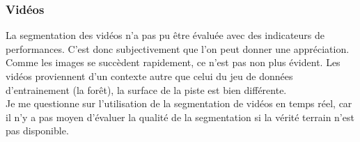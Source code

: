 \subsubsection{Vidéos}
\noindent La segmentation des vidéos n'a pas pu être évaluée avec des indicateurs de performances. C'est donc subjectivement que l'on peut donner une appréciation. Comme les images se succèdent rapidement, ce n'est pas non plus évident. Les vidéos proviennent d'un contexte autre que celui du jeu de données d'entrainement (la forêt), la surface de la piste est bien différente. 
\vspace{0.5\baselineskip}
\\
\noindent Je me questionne sur l'utilisation de la segmentation de vidéos en temps réel, car il n'y a pas moyen d'évaluer la qualité de la segmentation si la vérité terrain n'est pas disponible.